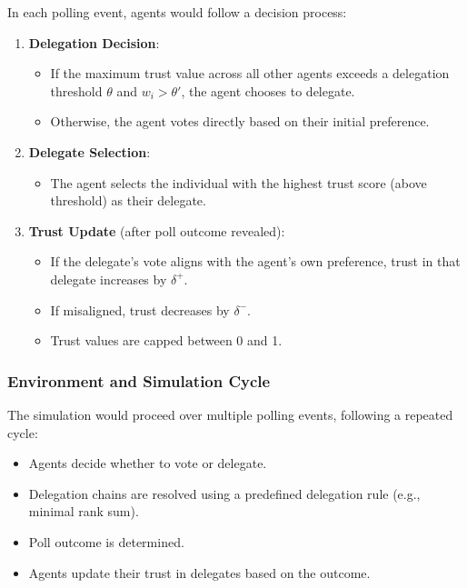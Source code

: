 In each polling event, agents would follow a decision process:
\begin{enumerate}
\item \textbf{Delegation Decision}:
\begin{itemize}
\item If the maximum trust value across all other agents exceeds a delegation threshold $\theta$ and $w_i > \theta'$, the agent chooses to delegate.
\item Otherwise, the agent votes directly based on their initial preference.
\end{itemize}

\item \textbf{Delegate Selection}:
\begin{itemize}
    \item The agent selects the individual with the highest trust score (above threshold) as their delegate.
\end{itemize}

\item \textbf{Trust Update} (after poll outcome revealed):
\begin{itemize}
    \item If the delegate's vote aligns with the agent's own preference, trust in that delegate increases by $\delta^+$.
    \item If misaligned, trust decreases by $\delta^-$.
    \item Trust values are capped between 0 and 1.
\end{itemize}

\end{enumerate}

\subsubsection{Environment and Simulation Cycle}

The simulation would proceed over multiple polling events, following a repeated cycle:
\begin{itemize}
\item Agents decide whether to vote or delegate.
\item Delegation chains are resolved using a predefined delegation rule (e.g., minimal rank sum).
\item Poll outcome is determined.
\item Agents update their trust in delegates based on the outcome.
\end{itemize}

